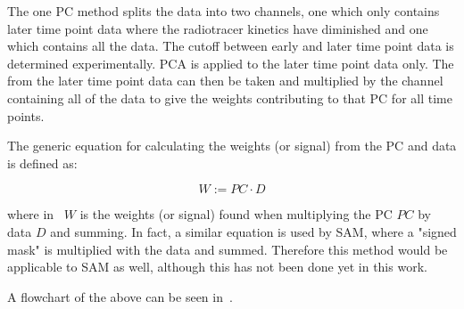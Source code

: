 \begin{itemize}
                        The one \gls{PC} method splits the data into two channels, one which only contains later time point data where the radiotracer kinetics have diminished and one which contains all the data. The cutoff between early and later time point data is determined experimentally. \gls{PCA} is applied to the later time point data only. The  from the later time point data can then be taken and multiplied by the channel containing all of the data to give the weights contributing to that \gls{PC} for all time points.
                        
                        The generic equation for calculating the weights (or signal) from the \gls{PC} and data is defined as:

                        \begin{equation} \label{eq:pca_data_driven_surrogate_signal_extraction_methods_for_dynamic_pet_methods_pc_weights}
                            W := PC \cdot D
                        \end{equation}
        
                        \noindent where in~ $W$ is the weights (or signal) found when multiplying the \gls{PC} $PC$ by data $D$ and summing. In fact, a similar equation is used by \gls{SAM}, where a "signed mask" is multiplied with the data and summed. Therefore this method would be applicable to SAM as well, although this has not been done yet in this work.
                    \end{itemize}
                    
                    A flowchart of the above can be seen in~.
                
